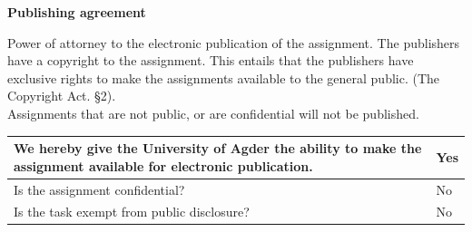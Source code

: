 \bigskip

\large{\bf{Publishing agreement}} \\

{\small {} Power of attorney to the electronic publication of the assignment. The publishers have a copyright to the
assignment. This entails that the publishers have exclusive rights to make the assignments available to the general public. (The Copyright Act. §2).
\\
Assignments that are not public, or are confidential will not be published. \\

\begin{center}
\begin{tabular}{ |p{13cm}|p{1cm}|}
\hline
We hereby give the University of Agder the ability to make the assignment available for electronic publication. & Yes \\
\hline
Is the assignment confidential? & No \\
\hline
Is the task exempt from public disclosure? & No \\
\hline
\end{tabular}
\end{center}
}